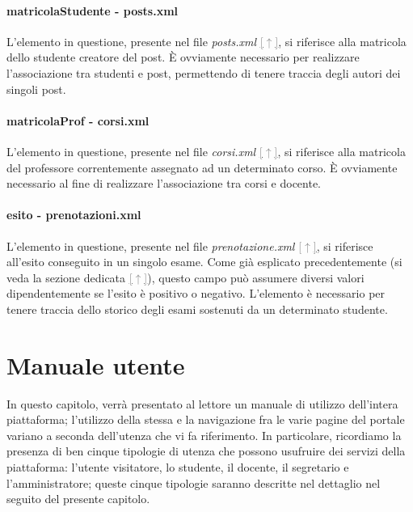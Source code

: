 \documentclass [a4paper,11pt]{book}
\begin{document}
\medskip

\subsubsection{matricolaStudente - posts.xml}

L'elemento in questione, presente nel file \emph{posts.xml} \hyperref[sec:posts]{\textcolor{gray}{[$\uparrow$]}}, si riferisce alla matricola dello studente creatore del post. È ovviamente necessario per realizzare l'associazione tra studenti e post, permettendo di tenere traccia degli autori dei singoli post.

\medskip

\subsubsection{matricolaProf - corsi.xml}

L'elemento in questione, presente nel file \emph{corsi.xml} \hyperref[sec:corsi]{\textcolor{gray}{[$\uparrow$]}}, si riferisce alla matricola del professore correntemente assegnato ad un determinato corso. È ovviamente necessario al fine di realizzare l'associazione tra corsi e docente.

\medskip

\subsubsection{esito - prenotazioni.xml}

L'elemento in questione, presente nel file \emph{prenotazione.xml} \hyperref[sec:prenotazioni]{\textcolor{gray}{[$\uparrow$]}}, si riferisce all'esito conseguito in un singolo esame. Come già esplicato precedentemente (si veda la sezione dedicata \hyperref[sec:esito]{\textcolor{gray}{[$\uparrow$]}}), questo campo può assumere diversi valori dipendentemente se l'esito è positivo o negativo. L'elemento è necessario per tenere traccia dello storico degli esami sostenuti da un determinato studente.

\medskip

\chapter{Manuale utente}

In questo capitolo, verrà presentato al lettore un manuale di utilizzo dell'intera piattaforma; l'utilizzo della stessa e la navigazione fra le varie pagine del portale variano a seconda dell'utenza che vi fa riferimento. In particolare, ricordiamo la presenza di ben cinque tipologie di utenza che possono usufruire dei servizi della piattaforma: l'utente visitatore, lo studente, il docente, il segretario e l'amministratore; queste cinque tipologie saranno descritte nel dettaglio nel seguito del presente capitolo.
\end{document}
